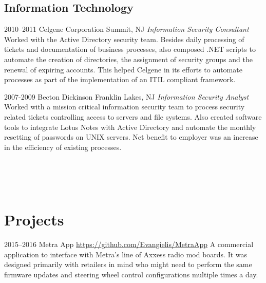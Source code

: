 \documentclass[]{friggeri-cv} %
\begin{document}
\subsection{Information Technology}

\begin{entrylist}

\entry
{2010--2011}
{Celgene Corporation}
{Summit, NJ}
{\emph{Information Security Consultant} \\
Worked with the Active Directory security team.  Besides daily processing of tickets and documentation of business processes, also composed .NET scripts to automate the creation of directories, the assignment of security groups and the renewal of expiring accounts.   This helped Celgene in its efforts to automate processes as part of the implementation of an ITIL compliant framework. }


\entry
{2007-2009}
{Becton Dickinson}
{Franklin Lakes, NJ}
{\emph{Information Security Analyst} \\
Worked with a mission critical information security team to process security related tickets controlling access to servers and file systems.  Also created software tools to integrate Lotus Notes with Active Directory and automate the monthly resetting of passwords on UNIX servers.  Net benefit to employer was an increase in the efficiency of existing processes. }

\\ \\ \\
\end{entrylist}



\section{Projects}

\begin{entrylist}


\entry
{2015--2016}
{Metra App}
{\href{https://github.com/Evangielis/MetraApp}{https://github.com/Evangielis/MetraApp}}
{A commercial application to interface with Metra's line of Axxess radio mod boards.  It was designed primarily with retailers in mind who might need to perform the same firmware updates and steering wheel control configurations multiple times a day.}
\end{entrylist}
\end{document}
